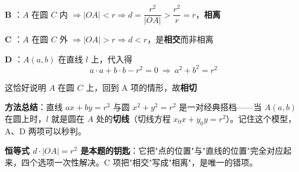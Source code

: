 \begin{answer}
\textbf{B }：$A$ 在圆 $C$ 内 $\Rightarrow|OA|<r\Rightarrow d=\dfrac{r^{2}}{|OA|}>\dfrac{r^{2}}r=r$，\textbf{相离} 

\textbf{C }：$A$ 在圆 $C$ 外 $\Rightarrow|OA|>r\Rightarrow d<r$，是\textbf{相交}而非相离 

\textbf{D }：$A(a,b)$ 在直线 $l$ 上，代入得
\nopagebreak[4]
\[a\cdot a+b\cdot b-r^{2}=0\ \Longrightarrow\ a^{2}+b^{2}=r^{2}\]

这恰好说明 $A$ 在圆 $C$ 上，回到 A 项的情形，故\textbf{相切} 

\begin{gktip}
\textbf{方法总结}：直线 $ax+by=r^{2}$ 与圆 $x^{2}+y^{2}=r^{2}$ 是一对经典搭档——当 $A(a,b)$ 在圆上时，$l$ 就是圆在 $A$ 处的\textbf{切线}（切线方程 $x_0x+y_0y=r^{2}$）。记住这个模型，A、D 两项可以秒判。

\textbf{恒等式 $d\cdot|OA|=r^{2}$ 是本题的钥匙}：它把"点的位置"与"直线的位置"完全对应起来，四个选项一次性解决。C 项把"相交"写成"相离"，是唯一的错项。
\end{gktip}


\par\medskip

\end{answer}
